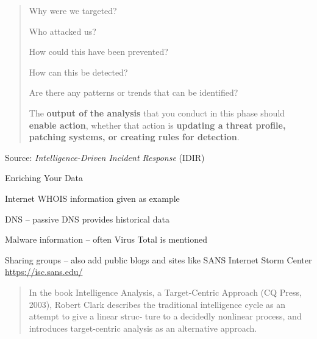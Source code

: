 \documentclass[Screen16to9,17pt]{foils}
\begin{document}


\begin{quote}

\begin{list2}
\item Why were we targeted?
\item Who attacked us?
\item How could this have been prevented?
\item How can this be detected?
\item Are there any patterns or trends that can be identified?
\end{list2}

The {\bf output of the analysis} that you conduct in this phase should {\bf enable action},
whether that action is {\bf updating a threat profile, patching systems, or creating rules for detection}.
\end{quote}
Source: \emph{Intelligence-Driven Incident Response} (IDIR)




\begin{quote}

\end{quote}

Enriching Your Data
\begin{list2}
\item Internet WHOIS information given as example
\item DNS -- passive DNS provides historical data
\item Malware information -- often Virus Total is mentioned
\item Sharing groups -- also add public blogs and sites like SANS Internet Storm Center\\
\url{https://isc.sans.edu/}
\end{list2}






\begin{quote}
In the book Intelligence Analysis, a Target-Centric Approach (CQ Press, 2003), Robert
Clark describes the traditional intelligence cycle as an attempt to give a linear struc‐
ture to a decidedly nonlinear process, and introduces target-centric analysis as an
alternative approach.
\end{quote}
\end{document}
